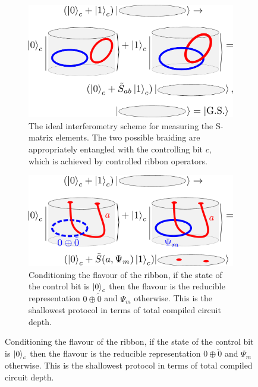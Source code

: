 \documentclass[two column]{article}
\begin{document}
\begin{figure}
\centering

\begin{subfigure}{0.47\textwidth}
    \includegraphics[width = \linewidth]{Figures/intef_example.pdf}
    \caption{The ideal interferometry scheme for measuring the S-matrix elements. The two possible braiding are appropriately entangled with the controlling bit $c$, which is achieved by controlled ribbon operators.}
    \label{fig:intef_example}
\end{subfigure}\hfill
\begin{subfigure}{0.47\textwidth}
    \includegraphics[width=\linewidth]{Figures/intefFlav.pdf}
    \caption{Conditioning the flavour of the ribbon, if the state of the control bit is $\ket{0}_c$ then the flavour is the reducible representation $0\oplus\tilde{0}$ and $\Psi_m$ otherwise. This is the shallowest protocol in terms of total compiled circuit depth.}
    \label{fig:cond_flav}
\end{subfigure}
\vspace{15pt}


\end{figure}
\end{document}
